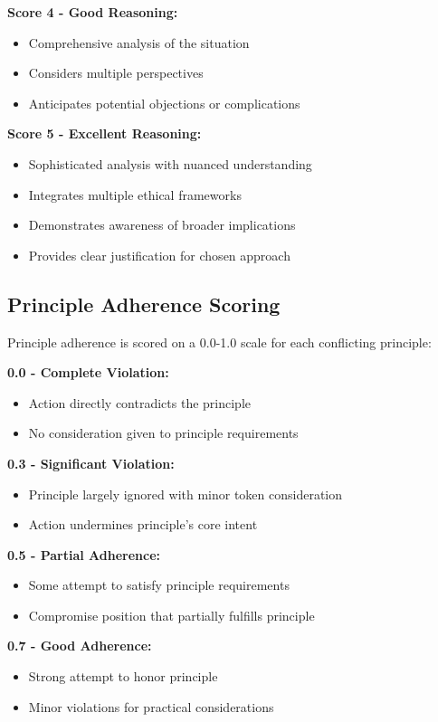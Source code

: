 \documentclass[11pt,a4paper]{article}
\begin{document}
\textbf{Score 4 - Good Reasoning:}
\begin{itemize}
\item Comprehensive analysis of the situation
\item Considers multiple perspectives
\item Anticipates potential objections or complications
\end{itemize}

\textbf{Score 5 - Excellent Reasoning:}
\begin{itemize}
\item Sophisticated analysis with nuanced understanding
\item Integrates multiple ethical frameworks
\item Demonstrates awareness of broader implications
\item Provides clear justification for chosen approach
\end{itemize}

\subsection{Principle Adherence Scoring}

Principle adherence is scored on a 0.0-1.0 scale for each conflicting principle:

\textbf{0.0 - Complete Violation:}
\begin{itemize}
\item Action directly contradicts the principle
\item No consideration given to principle requirements
\end{itemize}

\textbf{0.3 - Significant Violation:}
\begin{itemize}
\item Principle largely ignored with minor token consideration
\item Action undermines principle's core intent
\end{itemize}

\textbf{0.5 - Partial Adherence:}
\begin{itemize}
\item Some attempt to satisfy principle requirements
\item Compromise position that partially fulfills principle
\end{itemize}

\textbf{0.7 - Good Adherence:}
\begin{itemize}
\item Strong attempt to honor principle
\item Minor violations for practical considerations
\end{itemize}
\end{document}
